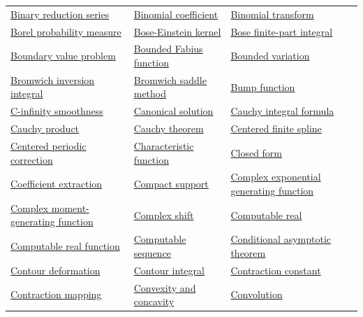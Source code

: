 \documentclass[11pt,oneside]{article}
\begin{document}
\begin{longtable}{p{}p{}p{}}
\hyperlink{gls:binary-reduction-series}{Binary reduction series} & \hyperlink{gls:binomial-coefficient}{Binomial coefficient} & \hyperlink{gls:binomial-transform}{Binomial transform} \\
\hyperlink{gls:borel-probability-measure}{Borel probability measure} & \hyperlink{gls:bose-einstein-kernel}{Bose-Einstein kernel} & \hyperlink{gls:bose-finite-part-integral}{Bose finite-part integral} \\
\hyperlink{gls:boundary-value-problem}{Boundary value problem} & \hyperlink{gls:bounded-fabius-function}{Bounded Fabius function} & \hyperlink{gls:bounded-variation}{Bounded variation} \\
\hyperlink{gls:bromwich-inversion-integral}{Bromwich inversion integral} & \hyperlink{gls:bromwich-saddle-method}{Bromwich saddle method} & \hyperlink{gls:bump-function}{Bump function} \\
\hyperlink{gls:c-infinity-smoothness}{C-infinity smoothness} & \hyperlink{gls:canonical-solution}{Canonical solution} & \hyperlink{gls:cauchy-integral-formula}{Cauchy integral formula} \\
\hyperlink{gls:cauchy-product}{Cauchy product} & \hyperlink{gls:cauchy-theorem}{Cauchy theorem} & \hyperlink{gls:centered-finite-spline}{Centered finite spline} \\
\hyperlink{gls:centered-periodic-correction}{Centered periodic correction} & \hyperlink{gls:characteristic-function}{Characteristic function} & \hyperlink{gls:closed-form}{Closed form} \\
\hyperlink{gls:coefficient-extraction}{Coefficient extraction} & \hyperlink{gls:compact-support}{Compact support} & \hyperlink{gls:complex-exponential-generating-function}{Complex exponential generating function} \\
\hyperlink{gls:complex-moment-generating-function}{Complex moment-generating function} & \hyperlink{gls:complex-shift}{Complex shift} & \hyperlink{gls:computable-real}{Computable real} \\
\hyperlink{gls:computable-real-function}{Computable real function} & \hyperlink{gls:computable-sequence}{Computable sequence} & \hyperlink{gls:conditional-asymptotic}{Conditional asymptotic theorem} \\
\hyperlink{gls:contour-deformation}{Contour deformation} & \hyperlink{gls:contour-integral}{Contour integral} & \hyperlink{gls:contraction-constant}{Contraction constant} \\
\hyperlink{gls:contraction-mapping}{Contraction mapping} & \hyperlink{gls:convexity-and-concavity}{Convexity and concavity} & \hyperlink{gls:convolution}{Convolution} \\

\end{longtable}
\end{document}
